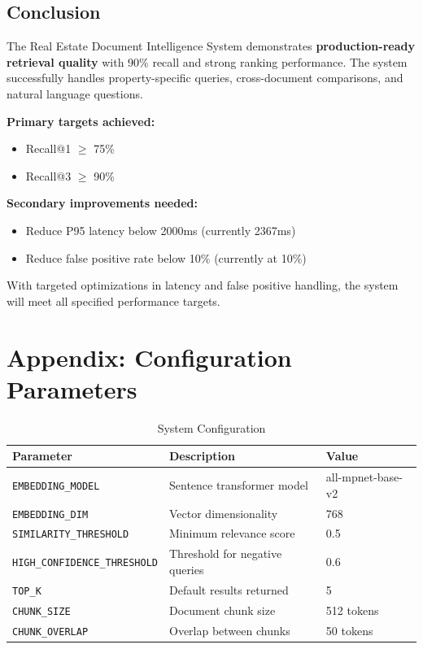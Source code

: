 \documentclass[11pt,a4paper]{article}
\begin{document}
\subsection{Conclusion}

The Real Estate Document Intelligence System demonstrates \textbf{production-ready retrieval quality} with 90\% recall and strong ranking performance. The system successfully handles property-specific queries, cross-document comparisons, and natural language questions.

\textbf{Primary targets achieved:}
\begin{itemize}
    \item[$\checkmark$] Recall@1 $\geq$ 75\%
    \item[$\checkmark$] Recall@3 $\geq$ 90\%
\end{itemize}

\textbf{Secondary improvements needed:}
\begin{itemize}
    \item[$\circ$] Reduce P95 latency below 2000ms (currently 2367ms)
    \item[$\circ$] Reduce false positive rate below 10\% (currently at 10\%)
\end{itemize}

With targeted optimizations in latency and false positive handling, the system will meet all specified performance targets.

\newpage
\appendix
\section{Appendix: Configuration Parameters}

\begin{table}[H]
\centering
\begin{tabularx}{\textwidth}{lXl}
\toprule
\textbf{Parameter} & \textbf{Description} & \textbf{Value} \\
\midrule
\texttt{EMBEDDING\_MODEL} & Sentence transformer model & all-mpnet-base-v2 \\
\texttt{EMBEDDING\_DIM} & Vector dimensionality & 768 \\
\texttt{SIMILARITY\_THRESHOLD} & Minimum relevance score & 0.5 \\
\texttt{HIGH\_CONFIDENCE\_THRESHOLD} & Threshold for negative queries & 0.6 \\
\texttt{TOP\_K} & Default results returned & 5 \\
\texttt{CHUNK\_SIZE} & Document chunk size & 512 tokens \\
\texttt{CHUNK\_OVERLAP} & Overlap between chunks & 50 tokens \\
\bottomrule
\end{tabularx}
\caption{System Configuration}
\end{table}
\end{document}
